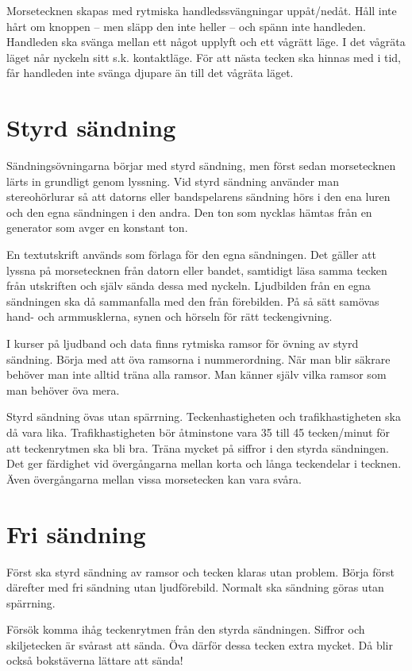 Morsetecknen skapas med rytmiska handledssvängningar uppåt/nedåt.
Håll inte hårt om knoppen -- men släpp den inte heller -- och spänn inte
handleden.
Handleden ska svänga mellan ett något upplyft och ett vågrätt läge.
I det vågräta läget når nyckeln sitt s.k. kontaktläge.
För att nästa tecken ska hinnas med i tid, får handleden inte svänga djupare än
till det vågräta läget.

\section{Styrd sändning}

Sändningsövningarna börjar med styrd sändning, men först sedan morsetecknen
lärts in grundligt genom lyssning.
Vid styrd sändning använder man stereohörlurar så att datorns eller
bandspelarens sändning hörs i den ena luren och den egna sändningen i den andra.
Den ton som nycklas hämtas från en generator som avger en konstant ton.

En textutskrift används som förlaga för den egna sändningen.
Det gäller att lyssna på morsetecknen från datorn eller bandet, samtidigt läsa
samma tecken från utskriften och själv sända dessa med nyckeln.
Ljudbilden från en egna sändningen ska då sammanfalla med den från förebilden.
På så sätt samövas hand- och armmusklerna, synen och hörseln för rätt
teckengivning.

I kurser på ljudband och data finns rytmiska ramsor för övning av styrd
sändning.
Börja med att öva ramsorna i nummerordning.
När man blir säkrare behöver man inte alltid träna alla ramsor.
Man känner själv vilka ramsor som man behöver öva mera.

Styrd sändning övas utan spärrning.
Teckenhastigheten och trafikhastigheten ska då vara lika.
Trafikhastigheten bör åtminstone vara 35 till 45 tecken/minut för
att teckenrytmen ska bli bra.
Träna mycket på siffror i den styrda sändningen.
Det ger färdighet vid övergångarna mellan korta och långa teckendelar i tecknen.
Även övergångarna mellan vissa morsetecken kan vara svåra.

\section{Fri sändning}

Först ska styrd sändning av ramsor och tecken klaras utan problem.
Börja först därefter med fri sändning utan ljudförebild.
Normalt ska sändning göras utan spärrning.

Försök komma ihåg teckenrytmen från den styrda sändningen.
Siffror och skiljetecken är svårast att sända.
Öva därför dessa tecken extra mycket.
Då blir också bokstäverna lättare att sända!

